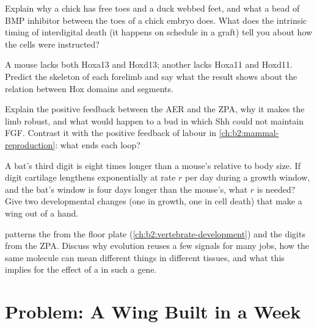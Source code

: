 \begin{exercise}[$\star\star$]\label{exo:b2:limb-organogenesis:8}
Explain why a chick has free toes and a duck webbed feet, and what a
bead of BMP inhibitor between the toes of a chick embryo does. What
does the intrinsic timing of interdigital death (it happens on
schedule in a graft) tell you about how the cells were instructed?
\end{exercise}

\begin{exercise}[$\star\star$]\label{exo:b2:limb-organogenesis:9}
A mouse lacks both Hoxa13 and Hoxd13; another lacks Hoxa11 and
Hoxd11. Predict the skeleton of each forelimb and say what the
result shows about the relation between Hox domains and segments.
\end{exercise}

\begin{exercise}[$\star\star\star$]\label{exo:b2:limb-organogenesis:10}
Explain the positive feedback between the AER and the ZPA, why it
makes the limb robust, and what would happen to a bud in which Shh
could not maintain FGF. Contrast it with the positive feedback of
labour in \cref{ch:b2:mammal-reproduction}: what ends each loop?
\end{exercise}

\begin{exercise}[$\star\star\star$]\label{exo:b2:limb-organogenesis:11}
A bat's third digit is eight times longer than a mouse's relative
to body size. If digit cartilage lengthens exponentially at rate
$r$ per day during a growth window, and the bat's window is four
days longer than the mouse's, what $r$ is needed? Give two
developmental changes (one in growth, one in cell death) that make
a wing out of a hand.
\end{exercise}

\begin{exercise}[$\star\star\star$]\label{exo:b2:limb-organogenesis:12}
 patterns the  from the floor plate
(\cref{ch:b2:vertebrate-development}) and the digits from the ZPA.
Discuss why evolution reuses a few signals for many jobs, how the
same molecule can mean different things in different tissues, and
what this implies for the effect of a  in such a gene.
\end{exercise}

\section{Problem: A Wing Built in a Week}

